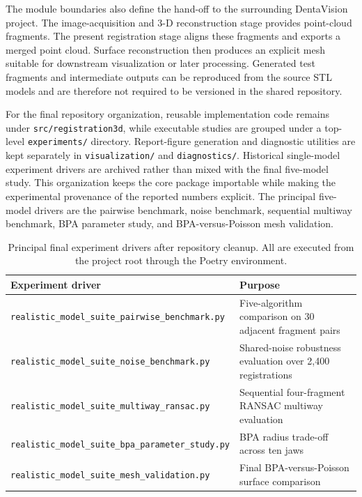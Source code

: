 The module boundaries also define the hand-off to the surrounding DentaVision project. The image-acquisition and 3-D reconstruction stage provides point-cloud fragments. The present registration stage aligns these fragments and exports a merged point cloud. Surface reconstruction then produces an explicit mesh suitable for downstream visualization or later processing. Generated test fragments and intermediate outputs can be reproduced from the source STL models and are therefore not required to be versioned in the shared repository.


For the final repository organization, reusable implementation code remains under \texttt{src/registration3d}, while executable studies are grouped under a top-level \texttt{experiments/} directory. Report-figure generation and diagnostic utilities are kept separately in \texttt{visualization/} and \texttt{diagnostics/}. Historical single-model experiment drivers are archived rather than mixed with the final five-model study. This organization keeps the core package importable while making the experimental provenance of the reported numbers explicit. The principal five-model drivers are the pairwise benchmark, noise benchmark, sequential multiway benchmark, BPA parameter study, and BPA-versus-Poisson mesh validation.


\begin{table}[!t]
\centering
\scriptsize
\setlength{\tabcolsep}{3pt}
\begin{tabularx}{\columnwidth}{@{}lY@{}}
\toprule
\textbf{Experiment driver} & \textbf{Purpose} \\
\midrule
\texttt{realistic\_model\_suite\_pairwise\_benchmark.py} & Five-algorithm comparison on 30 adjacent fragment pairs \\
\texttt{realistic\_model\_suite\_noise\_benchmark.py} & Shared-noise robustness evaluation over 2,400 registrations \\
\texttt{realistic\_model\_suite\_multiway\_ransac.py} & Sequential four-fragment RANSAC multiway evaluation \\
\texttt{realistic\_model\_suite\_bpa\_parameter\_study.py} & BPA radius trade-off across ten jaws \\
\texttt{realistic\_model\_suite\_mesh\_validation.py} & Final BPA-versus-Poisson surface comparison \\
\bottomrule
\end{tabularx}
\caption{Principal final experiment drivers after repository cleanup. All are executed from the project root through the Poetry environment.}
\label{tab:experiment-drivers}
\end{table}

